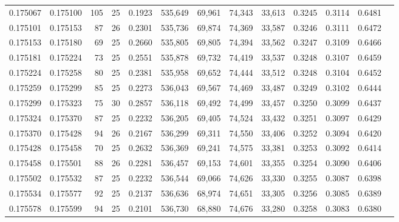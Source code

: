 \begin{tabular}{rrrrrrrrrrrrr}
0.175067 & 0.175100 & 105 &  25 &                                     0.1923 & 535,649 &  69,961 &  74,343 &  33,613 & 0.3245 & 0.3114 & 0.6481 \\
0.175101 & 0.175153 &  87 &  26 &                                     0.2301 & 535,736 &  69,874 &  74,369 &  33,587 & 0.3246 & 0.3111 & 0.6472 \\
0.175153 & 0.175180 &  69 &  25 &                                     0.2660 & 535,805 &  69,805 &  74,394 &  33,562 & 0.3247 & 0.3109 & 0.6466 \\
0.175181 & 0.175224 &  73 &  25 &                                     0.2551 & 535,878 &  69,732 &  74,419 &  33,537 & 0.3248 & 0.3107 & 0.6459 \\
0.175224 & 0.175258 &  80 &  25 &                                     0.2381 & 535,958 &  69,652 &  74,444 &  33,512 & 0.3248 & 0.3104 & 0.6452 \\
0.175259 & 0.175299 &  85 &  25 &                                     0.2273 & 536,043 &  69,567 &  74,469 &  33,487 & 0.3249 & 0.3102 & 0.6444 \\
0.175299 & 0.175323 &  75 &  30 &                                     0.2857 & 536,118 &  69,492 &  74,499 &  33,457 & 0.3250 & 0.3099 & 0.6437 \\
0.175324 & 0.175370 &  87 &  25 &                                     0.2232 & 536,205 &  69,405 &  74,524 &  33,432 & 0.3251 & 0.3097 & 0.6429 \\
0.175370 & 0.175428 &  94 &  26 &                                     0.2167 & 536,299 &  69,311 &  74,550 &  33,406 & 0.3252 & 0.3094 & 0.6420 \\
0.175428 & 0.175458 &  70 &  25 &                                     0.2632 & 536,369 &  69,241 &  74,575 &  33,381 & 0.3253 & 0.3092 & 0.6414 \\
0.175458 & 0.175501 &  88 &  26 &                                     0.2281 & 536,457 &  69,153 &  74,601 &  33,355 & 0.3254 & 0.3090 & 0.6406 \\
0.175502 & 0.175532 &  87 &  25 &                                     0.2232 & 536,544 &  69,066 &  74,626 &  33,330 & 0.3255 & 0.3087 & 0.6398 \\
0.175534 & 0.175577 &  92 &  25 &                                     0.2137 & 536,636 &  68,974 &  74,651 &  33,305 & 0.3256 & 0.3085 & 0.6389 \\
0.175578 & 0.175599 &  94 &  25 &                                     0.2101 & 536,730 &  68,880 &  74,676 &  33,280 & 0.3258 & 0.3083 & 0.6380 \\

\end{tabular}
